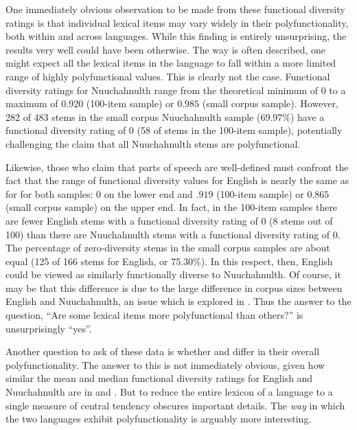One immediately obvious observation to be made from these functional diversity ratings is that individual lexical items may vary widely in their polyfunctionality, both within and across languages. While this finding is entirely unsurprising, the results very well could have been otherwise. The way  is often described, one might expect all the lexical items in the language to fall within a more limited range of highly polyfunctional values. This is clearly not the case. Functional diversity ratings for Nuuchahnulth range from the theoretical minimum of $0$ to a maximum of $0.920$ (100-item sample) or $0.985$ (small corpus sample). However, 282 of 483 stems in the small corpus Nuuchahnulth sample (69.97\%) have a functional diversity rating of $0$ (58 of stems in the 100-item sample), potentially challenging the claim that all Nuuchahnulth stems are polyfunctional.

Likewise, those who claim that  parts of speech are well-defined must confront the fact that the range of functional diversity values for English is nearly the same as for  for both samples: $0$ on the lower end and $.919$ (100-item sample) or $0.865$ (small corpus sample) on the upper end. In fact, in the 100-item samples there are fewer English stems with a functional diversity rating of $0$ (8 stems out of 100) than there are Nuuchahnulth stems with a functional diversity rating of $0$. The percentage of zero-diversity stems in the small corpus samples are about equal (125 of 166 stems for English, or 75.30\%). In this respect, then, English could be viewed as similarly functionally diverse to Nuuchahnulth. Of course, it may be that this difference is due to the large difference in corpus sizes between English and Nuuchahnulth, an issue which is explored in . Thus the answer to the question, \enquote{Are some lexical items more polyfunctional than others?} is unsurprisingly \enquote{yes}.

Another question to ask of these data is whether  and  differ in their overall polyfunctionality. The answer to this is not immediately obvious, given how similar the mean and median functional diversity ratings for English and Nuuchahnulth are in  and . But to reduce the entire lexicon of a language to a single measure of central tendency obscures important details. The \emph{way} in which the two languages exhibit polyfunctionality is arguably more interesting.

